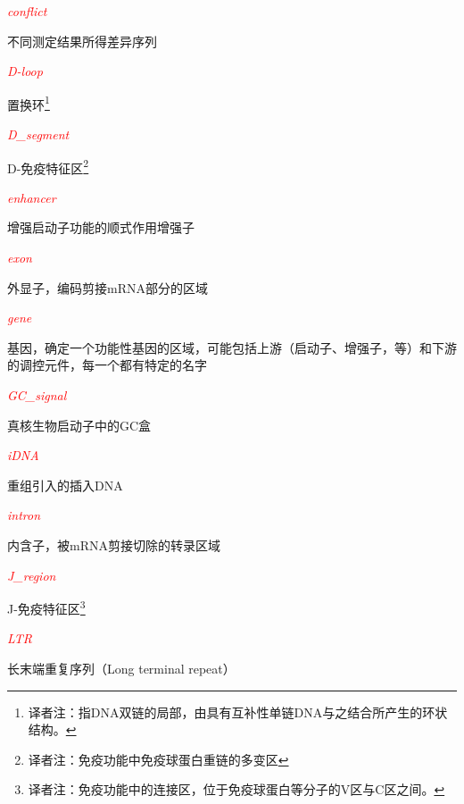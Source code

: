 \textcolor{red}{\textit{conflict}}
\begin{adjustwidth}{1cm}{}
不同测定结果所得差异序列
\end{adjustwidth}

\textcolor{red}{\textit{D-loop}}
\begin{adjustwidth}{1cm}{}
置换环\footnote{译者注：指DNA双链的局部，由具有互补性单链DNA与之结合所产生的环状结构。}
\end{adjustwidth}

\textcolor{red}{\textit{D\_segment}}
\begin{adjustwidth}{1cm}{}
D-免疫特征区\footnote{译者注：免疫功能中免疫球蛋白重链的多变区}
\end{adjustwidth}

\textcolor{red}{\textit{enhancer}}
\begin{adjustwidth}{1cm}{}
增强启动子功能的顺式作用增强子
\end{adjustwidth}

\textcolor{red}{\textit{exon}}
\begin{adjustwidth}{1cm}{}
外显子，编码剪接mRNA部分的区域
\end{adjustwidth}

\textcolor{red}{\textit{gene}}
\begin{adjustwidth}{1cm}{}
基因，确定一个功能性基因的区域，可能包括上游（启动子、增强子，等）和下游的调控元件，每一个都有特定的名字
\end{adjustwidth}

\textcolor{red}{\textit{GC\_signal}}
\begin{adjustwidth}{1cm}{}
真核生物启动子中的GC盒
\end{adjustwidth}

\textcolor{red}{\textit{iDNA}}
\begin{adjustwidth}{1cm}{}
重组引入的插入DNA
\end{adjustwidth}

\textcolor{red}{\textit{intron}}
\begin{adjustwidth}{1cm}{}
内含子，被mRNA剪接切除的转录区域
\end{adjustwidth}

\textcolor{red}{\textit{J\_region}}
\begin{adjustwidth}{1cm}{}
J-免疫特征区\footnote{译者注：免疫功能中的连接区，位于免疫球蛋白等分子的V区与C区之间。}
\end{adjustwidth}

\textcolor{red}{\textit{LTR}}
\begin{adjustwidth}{1cm}{}
长末端重复序列（Long terminal repeat）
\end{adjustwidth}


